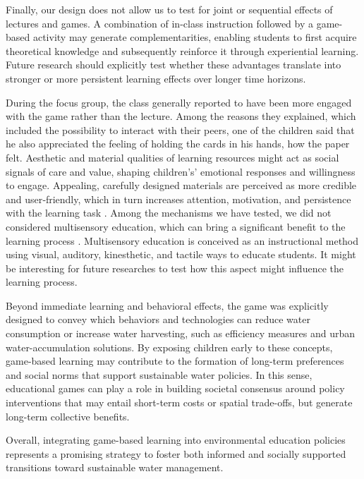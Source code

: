 \documentclass[preprint,12pt]{elsarticle}
\begin{document}
Finally, our design does not allow us to test for joint or sequential effects of lectures and games. A combination of in-class instruction followed by a game-based activity may generate complementarities, enabling students to first acquire theoretical knowledge and subsequently reinforce it through experiential learning. Future research should explicitly test whether these advantages translate into stronger or more persistent learning effects over longer time horizons.

During the focus group, the class generally reported to have been more engaged with the game rather than the lecture. Among the reasons they explained, which included the possibility to interact with their peers, one of the children said that he also appreciated the feeling of holding the cards in his hands, how the paper felt. Aesthetic and material qualities of learning resources might act as social signals of care and value, shaping children's’ emotional responses and willingness to engage. Appealing, carefully designed materials are perceived as more credible and user‑friendly, which in turn increases attention, motivation, and persistence with the learning task \cite{david2010impact}.
Among the mechanisms we have tested, we did not considered multisensory education, which can bring a significant benefit to the learning process \cite{volpe2019multisensory}. Multisensory education is conceived as an instructional method using visual, auditory, kinesthetic, and tactile ways to educate students. It might be interesting for future researches to test how this aspect might influence the learning process.

Beyond immediate learning and behavioral effects, the game was explicitly designed to convey which behaviors and technologies can reduce water consumption or increase water harvesting, such as efficiency measures and urban water-accumulation solutions. By exposing children early to these concepts, game-based learning may contribute to the formation of long-term preferences and social norms that support sustainable water policies. In this sense, educational games can play a role in building societal consensus around policy interventions that may entail short-term costs or spatial trade-offs, but generate long-term collective benefits.

Overall, integrating game-based learning into environmental education policies represents a promising strategy to foster both informed and socially supported transitions toward sustainable water management.
\end{document}
